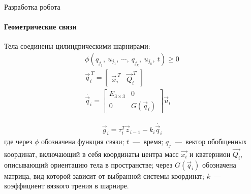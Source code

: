 \documentclass[aspectratio=169,xcolor=table]{beamer}
\begin{document}
\begin{frame}[t]{Разработка робота}
\framesubtitle{Геометрические связи}
\vspace{-0.5cm}
Тела соединены цилиндрическими шарнирами:
\begin{align*}
    \label{eq:kin_constr}
    \phi(q_{j_1},\ u_{j_1},\ \cdots,\ q_{j_k},\ u_{j_k},\ t) \geqslant  0 \\
    \vec{q}_i^{\ T} = \begin{bmatrix}
        \vec{x}_i^{\ T} & \vec{Q}_i^{\ T}
    \end{bmatrix} \\
    \dot{\vec{q}_i} = \begin{bmatrix}
    E_{3\times3} & 0\\ 
    0 & G(\vec{q}_i) 
    \end{bmatrix}\vec{u}_i  
\end{align*}

\begin{align*}
    \vec{g}_i = \tau_i^T \vec{z}_{i-1} -k_i \dot{\vec{q}_i} 
\end{align*}
где через $\phi$ обозначена функция связи; $t$~---~время; $q_{j}$~---~вектор обобщенных координат, включающий в себя координаты центра масс $\vec{x_i}$ и кватернион $\vec{Q_i}$, описывающий ориентацию тела в пространстве; через $G(\vec{q}_i)$ обозначена матрица, вид которой зависит от выбранной системы координат; $k$~---~ коэффициент вязкого трения в шарнире.
\end{frame}
\end{document}
